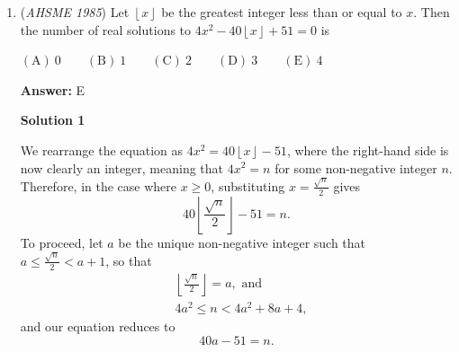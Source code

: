 \begin{enumerate}
\textbf{Solution 2}

Factoring out the 8 and the 5, we get 
 \[9ab = 10\cdot4\cdot9\cdot111 \dotsb 1 \cdot 111\dotsb1,\] where there are $1985$ ones in both numbers.

 


 This is equal to 
 \[10 \cdot 4 \cdot (1000\dotsb 0 - 1) \cdot 111\dotsb 1\] where there is an initial $1$ followed by $1985$ zeros and the second number has $1985$ ones.

 


 Multiplying then subtracting gives us 
 \[4 \cdot 10 \cdot 111\dotsb 10888 \dotsb 89,\] where there are $1984$ ones and $1984$ eights.

 


 Multiplying one last time, then adding the $0$ at the end gives us 
 \[44 \dotsb 4355 \dotsb 560,\] where there are $1984$ fours, $1$ three, $1984$ fives, $1$ six, and a final zero, so the sum of the digits is 
 \[1984(4+5)+6+3 = 1985 \cdot 9 = \boxed{ \text{ C)     }17865}\]



	\item (\textit{AHSME 1985}) Let $\left\lfloor x\right\rfloor$ be the greatest integer less than or equal to $x$. Then the number of real solutions to $4x^2-40\left\lfloor x\right\rfloor+51 = 0$ is


 $\mathrm{(A)\ } 0 \qquad \mathrm{(B) \ }1 \qquad \mathrm{(C) \  } 2 \qquad \mathrm{(D) \  } 3 \qquad \mathrm{(E) \  }4$

 \textbf{Answer: }E



\textbf{Solution 1}

We rearrange the equation as $4x^2 = 40\left\lfloor x\right\rfloor-51$, where the right-hand side is now clearly an integer, meaning that $4x^2 = n$ for some non-negative integer $n$. Therefore, in the case where $x \geq 0$, substituting $x = \frac{\sqrt{n}}{2}$ gives
 \[40\left\lfloor\frac{\sqrt{n}}{2}\right\rfloor-51 = n.\] To proceed, let $a$ be the unique non-negative integer such that $a \leq \frac{\sqrt{n}}{2} < a+1$, so that 
 \begin{align*}&\left\lfloor \frac{\sqrt{n}}{2}\right\rfloor = a, \text{ and} \\ &4a^2 \leq n < 4a^2+8a+4,\end{align*}
 and our equation reduces to 
 \[40a-51 = n.\]


\end{enumerate}
